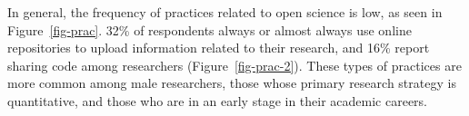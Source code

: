 \documentclass[
  letterpaper,
  DIV=11,
  numbers=noendperiod]{scrartcl}
\begin{document}
In general, the frequency of practices related to open science is low,
as seen in Figure~\ref{fig-prac}. 32\% of respondents always or almost
always use online repositories to upload information related to their
research, and 16\% report sharing code among researchers
(Figure~\ref{fig-prac-2}). These types of practices are more common
among male researchers, those whose primary research strategy is
quantitative, and those who are in an early stage in their academic
careers.

\begin{figure}

\begin{minipage}[t]{0.50\linewidth}

{\centering 


}

\end{minipage}%
%
\begin{minipage}[t]{0.50\linewidth}

{\centering 

\raisebox{-\height}{

}}
\end{minipage}
\end{figure}
\end{document}
